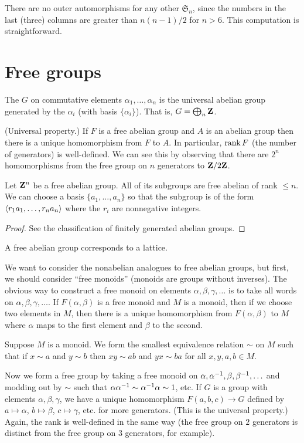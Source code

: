 \documentclass[11pt, twoside]{amsart}
\begin{document}
There are no outer automorphisms for any other $\mathfrak{S}_n$, since the numbers in the last (three) columns are greater than $n(n-1)/2$ for $n>6$. This computation is straightforward. 

\section{Free groups}
\begin{definition}
The  $G$ on commutative elements $\alpha_1,\hdots,\alpha_n$ is the universal abelian group generated by the $\alpha_i$ (with basis $\{\alpha_i\}$). That is, $G = \bigoplus_n \mathbf{Z}$.
\end{definition}

(Universal property.) If $F$ is a free abelian group and $A$ is an abelian group then there is a unique homomorphism from $F$ to $A$. In particular, $\operatorname{rank} F$ (the number of generators) is well-defined. We can see this by observing that there are $2^n$ homomorphisms from the free group on $n$ generators to $\mathbf{Z}/2\mathbf{Z} $.

Let $\mathbf{Z}^n$ be a free abelian group. All of its subgroups are free abelian of rank $\le n$. We can choose a basis $\{a_1,\hdots,a_n\}$ so that the subgroup is of the form $\left \langle r_1a_1,\hdots, r_na_n \right \rangle$ where the $r_i$ are nonnegative integers.

\begin{proof}
See the classification of finitely generated abelian groups.
\end{proof}

A free abelian group corresponds to a lattice.

We want to consider the nonabelian analogues to free abelian groups, but first, we should consider ``free monoids'' (monoids are groups without inverses). The obvious way to construct a free monoid on elements 
$\alpha,\beta,\gamma,\hdots$ is to take all words on $\alpha,\beta,\gamma,\hdots$. If $F(\alpha,\beta)$ is a free monoid and $M$ is a monoid, then if we choose two elements in $M$, then there is a unique homomorphism from $F(\alpha,\beta)$ to $M$ where $\alpha$ maps to the first element and $\beta$ to the second.

Suppose $M$ is a monoid. We form the smallest equivalence relation $\sim$ on $M$ such that if $x\sim a$ and $y\sim b$ then $xy \sim ab$ and $yx \sim ba$ for all $x,y,a,b\in M$.

Now we form a free group by taking a free monoid on $\alpha, \alpha^{-1},\beta,\beta^{-1},\hdots$ and modding out by $\sim$ such that $\alpha\alpha^{-1} \sim \alpha^{-1}\alpha \sim 1$, etc. If $G$ is a group with elements $\alpha,\beta,\gamma$, we have a unique homomorphism $F(a,b,c) \longrightarrow G$ defined by $a\mapsto \alpha$, $b\mapsto \beta$, $c\mapsto \gamma$, etc. for more generators. (This is the universal property.) Again, the rank is well-defined in the same way (the free group on $2$ generators is distinct from the free group on $3$ generators, for example).
\end{document}
